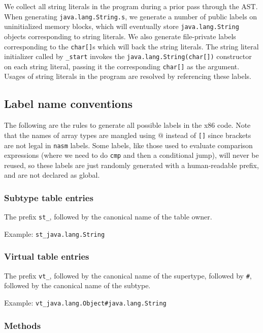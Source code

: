 \documentclass[12pt]{article}
\newcommand{\code}[1]{\texttt{#1}}
\begin{document}
We collect all string literals in the program during a prior pass through the AST.  When generating \code{java.lang.String.s}, we generate a number of public labels on uninitialized memory blocks, which will eventually store \code{java.lang.String} objects corresponding to string literals.  We also generate file-private labels corresponding to the \code{char[]}s which will back the string literals.  The string literal initializer called by \code{\_start} invokes the \code{java.lang.String(char[])} constructor on each string literal, passing it the corresponding \code{char[]} as the argument.  Usages of string literals in the program are resolved by referencing these labels.

\subsection{Label name conventions}

The following are the rules to generate all possible labels in the x86 code. Note that the names of array types are mangled using \code{$@$} instead of \code{[]} since brackets are not legal in \code{nasm} labels. Some labels, like those used to evaluate comparison expressions (where we need to do \code{cmp} and then a conditional jump), will never be reused, so these labels are just randomly generated with a human-readable prefix, and are not declared as global.

\subsubsection{Subtype table entries}

The prefix \code{st\_}, followed by the canonical name of the table owner.

Example: \code{st\_java.lang.String} 

\subsubsection{Virtual table entries}

The prefix \code{vt\_}, followed by the canonical name of the supertype, followed by \code{\#}, followed by the canonical name of the subtype.

Example: \code{vt\_java.lang.Object\#java.lang.String} 

\subsubsection{Methods}
\end{document}
